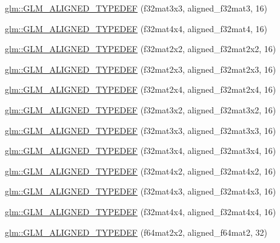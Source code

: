\begin{DoxyCompactItemize}
\item 
\hyperlink{group__gtx__type__aligned_gadd8ddbe2bf65ccede865ba2f510176dc}{glm\-::\-G\-L\-M\-\_\-\-A\-L\-I\-G\-N\-E\-D\-\_\-\-T\-Y\-P\-E\-D\-E\-F} (f32mat3x3, aligned\-\_\-f32mat3, 16)
\item 
\hyperlink{group__gtx__type__aligned_gaf18dbff14bf13d3ff540c517659ec045}{glm\-::\-G\-L\-M\-\_\-\-A\-L\-I\-G\-N\-E\-D\-\_\-\-T\-Y\-P\-E\-D\-E\-F} (f32mat4x4, aligned\-\_\-f32mat4, 16)
\item 
\hyperlink{group__gtx__type__aligned_ga66339f6139bf7ff19e245beb33f61cc8}{glm\-::\-G\-L\-M\-\_\-\-A\-L\-I\-G\-N\-E\-D\-\_\-\-T\-Y\-P\-E\-D\-E\-F} (f32mat2x2, aligned\-\_\-f32mat2x2, 16)
\item 
\hyperlink{group__gtx__type__aligned_ga1558a48b3934011b52612809f443e46d}{glm\-::\-G\-L\-M\-\_\-\-A\-L\-I\-G\-N\-E\-D\-\_\-\-T\-Y\-P\-E\-D\-E\-F} (f32mat2x3, aligned\-\_\-f32mat2x3, 16)
\item 
\hyperlink{group__gtx__type__aligned_gaa52e5732daa62851627021ad551c7680}{glm\-::\-G\-L\-M\-\_\-\-A\-L\-I\-G\-N\-E\-D\-\_\-\-T\-Y\-P\-E\-D\-E\-F} (f32mat2x4, aligned\-\_\-f32mat2x4, 16)
\item 
\hyperlink{group__gtx__type__aligned_gac09663c42566bcb58d23c6781ac4e85a}{glm\-::\-G\-L\-M\-\_\-\-A\-L\-I\-G\-N\-E\-D\-\_\-\-T\-Y\-P\-E\-D\-E\-F} (f32mat3x2, aligned\-\_\-f32mat3x2, 16)
\item 
\hyperlink{group__gtx__type__aligned_ga3f510999e59e1b309113e1d561162b29}{glm\-::\-G\-L\-M\-\_\-\-A\-L\-I\-G\-N\-E\-D\-\_\-\-T\-Y\-P\-E\-D\-E\-F} (f32mat3x3, aligned\-\_\-f32mat3x3, 16)
\item 
\hyperlink{group__gtx__type__aligned_ga2c9c94f0c89cd71ce56551db6cf4aaec}{glm\-::\-G\-L\-M\-\_\-\-A\-L\-I\-G\-N\-E\-D\-\_\-\-T\-Y\-P\-E\-D\-E\-F} (f32mat3x4, aligned\-\_\-f32mat3x4, 16)
\item 
\hyperlink{group__gtx__type__aligned_ga99ce8274c750fbfdf0e70c95946a2875}{glm\-::\-G\-L\-M\-\_\-\-A\-L\-I\-G\-N\-E\-D\-\_\-\-T\-Y\-P\-E\-D\-E\-F} (f32mat4x2, aligned\-\_\-f32mat4x2, 16)
\item 
\hyperlink{group__gtx__type__aligned_ga9476ef66790239df53dbe66f3989c3b5}{glm\-::\-G\-L\-M\-\_\-\-A\-L\-I\-G\-N\-E\-D\-\_\-\-T\-Y\-P\-E\-D\-E\-F} (f32mat4x3, aligned\-\_\-f32mat4x3, 16)
\item 
\hyperlink{group__gtx__type__aligned_gacc429b3b0b49921e12713b6d31e14e1d}{glm\-::\-G\-L\-M\-\_\-\-A\-L\-I\-G\-N\-E\-D\-\_\-\-T\-Y\-P\-E\-D\-E\-F} (f32mat4x4, aligned\-\_\-f32mat4x4, 16)
\item 
\hyperlink{group__gtx__type__aligned_ga88f6c6fa06e6e64479763e69444669cf}{glm\-::\-G\-L\-M\-\_\-\-A\-L\-I\-G\-N\-E\-D\-\_\-\-T\-Y\-P\-E\-D\-E\-F} (f64mat2x2, aligned\-\_\-f64mat2, 32)

\end{DoxyCompactItemize}
